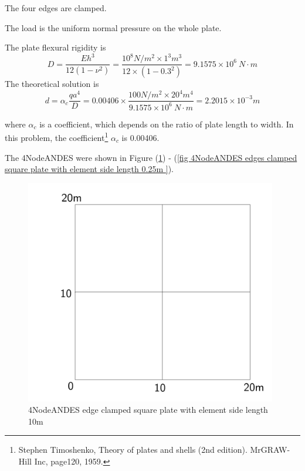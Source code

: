 \documentclass[fleqn,11pt]{article}
\begin{document}
The four edges are clamped. 

The load is the uniform normal pressure on the whole plate. 


The plate flexural rigidity is 
\begin{equation}
  D=\frac{Eh^3}{12(1-\nu^2)}=\frac{10^8 N/m^2 \times 1^3 m^3 }{12 \times (1-0.3^2) }= 9.1575 \times 10^6 \ N\cdot m
\end{equation}
The theoretical solution is 
\begin{equation}
  d=\alpha_c \frac{q a^4}{D}=0.00406\times \frac{100 N/m^2 \times 20^4 m^4}{9.1575 \times 10^6 \ N\cdot m}=2.2015\times 10^{-3} m
\end{equation}

where $\alpha_c$ is a coefficient, which depends on the ratio of plate length to width. In this problem, the coefficient\footnote{Stephen Timoshenko, Theory of plates and shells (2nd edition). MrGRAW-Hill Inc, page120, 1959.} $\alpha_c$ is 0.00406.



The 4NodeANDES were shown in Figure (\ref{fig 4NodeANDES edges clamped square plate with element side length 10m }) - (\ref{fig 4NodeANDES edges clamped square plate with element side length 0.25m }). 


\begin{figure}[H]
  \centering
  \includegraphics[width=11cm]{../Figure-files/square_plate1.pdf}
  \caption{4NodeANDES edge clamped square plate with element side length 10m }
  \label{fig 4NodeANDES edges clamped square plate with element side length 10m }
\end{figure}
\end{document}
